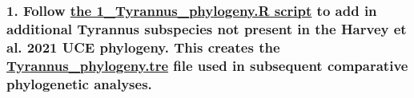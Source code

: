 \documentclass[]{article}
\begin{document}
\subsubsection{\texorpdfstring{1. Follow
\href{https://github.com/mmacphe/Tyrannus_morphology/blob/main/1_Tyrannus_phylogeny.R}{the
1\_Tyrannus\_phylogeny.R script} to add in additional Tyrannus
subspecies not present in the Harvey et al. 2021 UCE phylogeny. This
creates the
\href{https://github.com/mmacphe/Tyrannus_morphology/blob/main/Output\%20Files/Tyrannus_phylogeny.tre}{Tyrannus\_phylogeny.tre}
file used in subsequent comparative phylogenetic
analyses.}{1. Follow the 1\_Tyrannus\_phylogeny.R script to add in additional Tyrannus subspecies not present in the Harvey et al. 2021 UCE phylogeny. This creates the Tyrannus\_phylogeny.tre file used in subsequent comparative phylogenetic analyses.}}\label{follow-the-1_tyrannus_phylogeny.r-script-to-add-in-additional-tyrannus-subspecies-not-present-in-the-harvey-et-al.-2021-uce-phylogeny.-this-creates-the-tyrannus_phylogeny.tre-file-used-in-subsequent-comparative-phylogenetic-analyses.}
\end{document}
